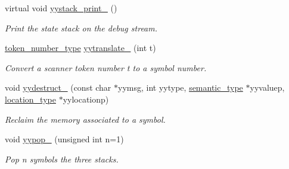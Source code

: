 \begin{DoxyCompactItemize}
virtual void \hyperlink{classyy_1_1_parser_implementation_adc4daa0ac53c3be00629435692b32506}{yystack\_\-print\_\-} ()
\begin{DoxyCompactList}\small\item\em Print the state stack on the debug stream. \end{DoxyCompactList}\item 
\hyperlink{classyy_1_1_parser_implementation_a729ec5de6d4445eb556d2db42cbb4bde}{token\_\-number\_\-type} \hyperlink{classyy_1_1_parser_implementation_ac8eb0c66a4327f3f279eb34a2f259c3b}{yytranslate\_\-} (int t)
\begin{DoxyCompactList}\small\item\em Convert a scanner token number {\itshape t\/} to a symbol number. \end{DoxyCompactList}\item 
void \hyperlink{classyy_1_1_parser_implementation_a56677e453ce68ec02b4023cac53f37fd}{yydestruct\_\-} (const char $\ast$yymsg, int yytype, \hyperlink{unionyy_1_1_parser_implementation_1_1semantic__type}{semantic\_\-type} $\ast$yyvaluep, \hyperlink{classyy_1_1location}{location\_\-type} $\ast$yylocationp)
\begin{DoxyCompactList}\small\item\em Reclaim the memory associated to a symbol. \end{DoxyCompactList}\item 
void \hyperlink{classyy_1_1_parser_implementation_af84dc4db5f1da6d310b9c960d320a644}{yypop\_\-} (unsigned int n=1)
\begin{DoxyCompactList}\small\item\em Pop {\itshape n\/} symbols the three stacks. \end{DoxyCompactList}\end{DoxyCompactItemize}
